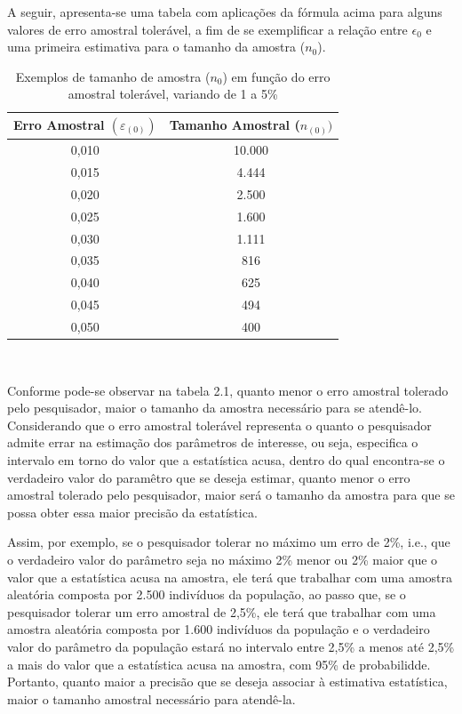 \newpage
A seguir, apresenta-se uma tabela com aplicações da fórmula acima para alguns valores de erro amostral tolerável, a fim de se exemplificar a relação entre $\epsilon_{0}$ e uma primeira estimativa para o tamanho da amostra ($n_{0}$).


\begin{table}[!htb]
    \centering
    {
    \caption{Exemplos de tamanho de amostra ($n_{0}$) em função do erro amostral tolerável, variando de 1 a 5\%}
    \label{amostras}
    \vspace{0.1cm}
\begin{tabular}{c|c}
  \hline\hline
  Erro Amostral $(\varepsilon_{(0)})$   & Tamanho Amostral ($n_{(0)})$ \\
  \hline\hline
  0,010    &  10.000 \\
  0,015    &  4.444 \\
  0,020    &  2.500 \\
  0,025    &  1.600 \\
  0,030    &  1.111 \\
  0,035    &  816 \\
  0,040    &  625 \\
  0,045    &  494 \\
  0,050    &  400 \\
  \hline\hline
\end{tabular}}
\\
\hspace{-1.0cm}
\end{table}



Conforme pode-se observar na tabela 2.1, quanto menor o erro
amostral tolerado pelo pesquisador, maior o tamanho da amostra
necessário para se atendê-lo. Considerando que o erro amostral
tolerável representa o quanto o pesquisador admite errar na
estimação dos parâmetros de interesse, ou seja, especifica o
intervalo em torno do valor que a estatística acusa, dentro do
qual encontra-se o verdadeiro valor do paramêtro que se deseja
estimar, quanto menor o erro amostral tolerado pelo pesquisador,
maior será o tamanho da amostra para que se possa obter essa maior
precisão da estatística.\vskip0.3cm


Assim, por exemplo, se o pesquisador tolerar no máximo um erro de 2\%, i.e., que o verdadeiro valor do parâmetro seja no máximo 2\% menor ou 2\% maior que o valor que a estatística acusa na amostra, ele terá que trabalhar com uma amostra aleatória composta por 2.500 indivíduos da população, ao passo que, se o pesquisador tolerar um erro amostral de 2,5\%, ele terá que trabalhar com uma amostra aleatória composta por 1.600 indivíduos da população e o verdadeiro valor do parâmetro da população estará no intervalo entre 2,5\% a menos até 2,5\% a mais do valor que a estatística acusa na amostra, com 95\% de probabilidde. Portanto, quanto maior a precisão que se deseja associar à estimativa estatística, maior o tamanho amostral necessário para atendê-la.\vskip0.3cm


